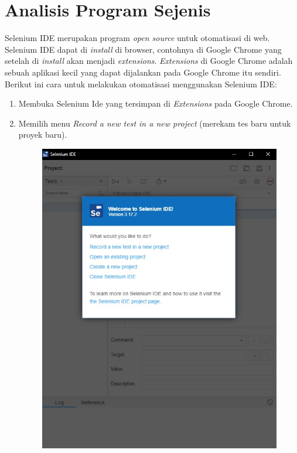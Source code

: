 \section{Analisis Program Sejenis}
\label{sec:seleniumIDE}  
Selenium IDE merupakan program \textit{open source} untuk otomatisasi di web. Selenium IDE dapat di \textit{install} di browser, contohnya di Google Chrome yang setelah di \textit{install} akan menjadi \textit{extensions}. \textit{Extensions} di Google Chrome adalah sebuah aplikasi kecil yang dapat dijalankan pada Google Chrome itu sendiri. Berikut ini cara untuk melakukan otomatisasi menggunakan Selenium IDE:
	\begin{enumerate}
		\item Membuka Selenium Ide yang tersimpan di \textit{Extensions} pada Google Chrome.
		\item Memilih menu \textit{Record a new test in a new project} (merekam tes baru untuk proyek baru).
		\begin{figure}[H]
			\centering
			\includegraphics[scale=0.5]{Gambar/menuSeleniumIDE.jpg}

\end{figure}
\end{enumerate}

